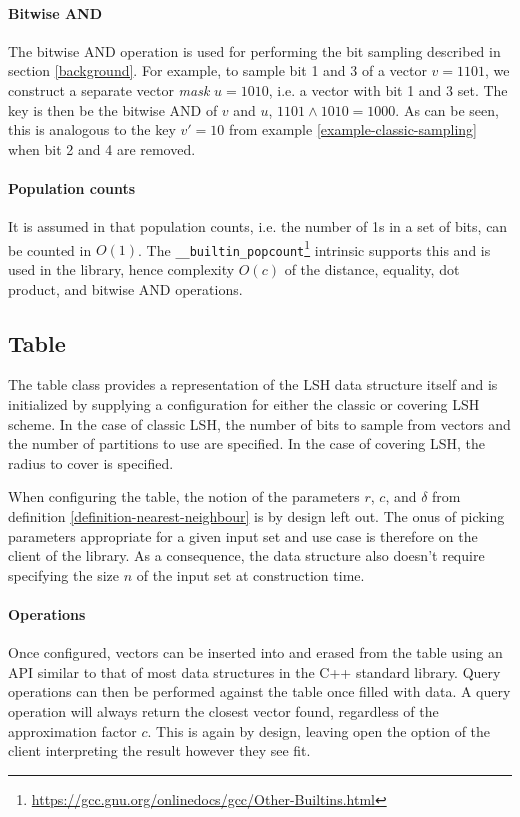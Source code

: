 \paragraph{Bitwise AND} The bitwise AND operation is used for performing the bit sampling described in section \ref{background}. For example, to sample bit 1 and 3 of a vector $v = 1101$, we construct a separate vector \textit{mask} $u = 1010$, i.e. a vector with bit 1 and 3 set. The key is then be the bitwise AND of $v$ and $u$, $1101 \wedge 1010 = 1000$. As can be seen, this is analogous to the key $v' = 10$ from example \ref{example-classic-sampling} when bit 2 and 4 are removed.

\paragraph{Population counts} It is assumed in \cite{DBLP:journals/corr/Pagh15} that population counts, i.e. the number of 1s in a set of bits, can be counted in $O(1)$. The \texttt{\_\_builtin\_popcount}\footnote{\url{https://gcc.gnu.org/onlinedocs/gcc/Other-Builtins.html}} intrinsic supports this and is used in the library, hence complexity $O(c)$ of the distance, equality, dot product, and bitwise AND operations.

\subsection{Table}

The table class provides a representation of the LSH data structure itself and is initialized by supplying a configuration for either the classic or covering LSH scheme. In the case of classic LSH, the number of bits to sample from vectors and the number of partitions to use are specified. In the case of covering LSH, the radius to cover is specified.

When configuring the table, the notion of the parameters $r$, $c$, and $\delta$ from definition \ref{definition-nearest-neighbour} is by design left out. The onus of picking parameters appropriate for a given input set and use case is therefore on the client of the library. As a consequence, the data structure also doesn't require specifying the size $n$ of the input set at construction time.

\paragraph{Operations} Once configured, vectors can be inserted into and erased from the table using an API similar to that of most data structures in the C++ standard library. Query operations can then be performed against the table once filled with data. A query operation will always return the closest vector found, regardless of the approximation factor $c$. This is again by design, leaving open the option of the client interpreting the result however they see fit.

